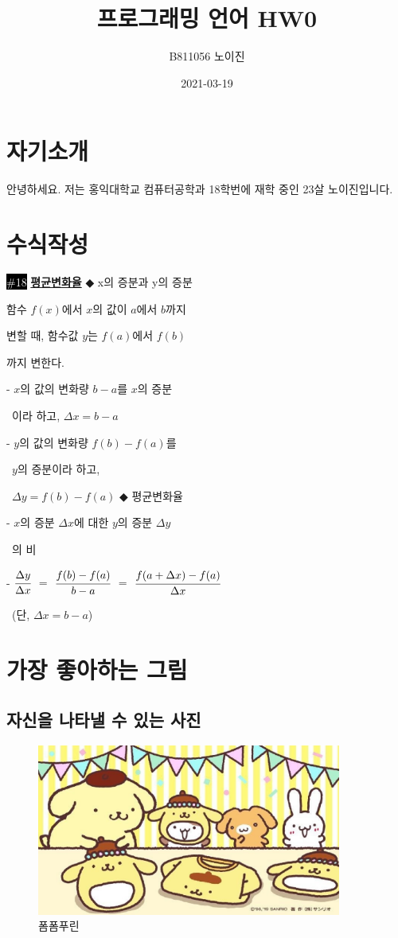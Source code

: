 \documentclass{article}
\begin{document}
\title{프로그래밍 언어 HW0}
\author{B811056 노이진}
\date{2021-03-19}
\maketitle

\section{자기소개}
 안녕하세요. 저는 홍익대학교 컴퓨터공학과 18학번에 재학 중인 23살 노이진입니다.
\section{수식작성}

\colorbox{black}{\textcolor{white}{\#18}}  \textbf{\uline{평균변화율}}\newline
$\Diamondblack$ x의 증분과 y의 증분

 함수 $f(x)$에서 $x$의 값이 $a$에서 $b$까지
 
 변할 때, 함수값 $y$는 $f(a)$에서 $f(b)$
 
 까지 변한다.
 
  - $x$의 값의 변화량 $b-a$를 $x$의 증분
  
  \, 이라 하고, $\Delta$$x=b-a$
  
  - $y$의 값의 변화량 $f(b)-f(a)$를 
  
  \, $y$의 증분이라 하고,
  
  \, $\Delta$$y=f(b)-f(a)$\newline
$\Diamondblack$ 평균변화율

- $x$의 증분 $\Delta$$x$에 대한 $y$의 증분 $\Delta$$y$

\, 의 비


- $\cfrac{\Delta y}{\Delta x}$
$=$
$\cfrac{f(b)-f(a)}{b-a}$
$=$
$\cfrac{f(a+\Delta x)-f(a)}{\Delta x}$

\, (단, $\Delta$$x=b-a$)

\section{가장 좋아하는 그림}
\subsection{자신을 나타낼 수 있는 사진}
\begin{figure}[h]
\centering
   \includegraphics[width=10cm]{image1}
\caption{폼폼푸린}
\label{3.1}
\end{figure}
\end{document}
